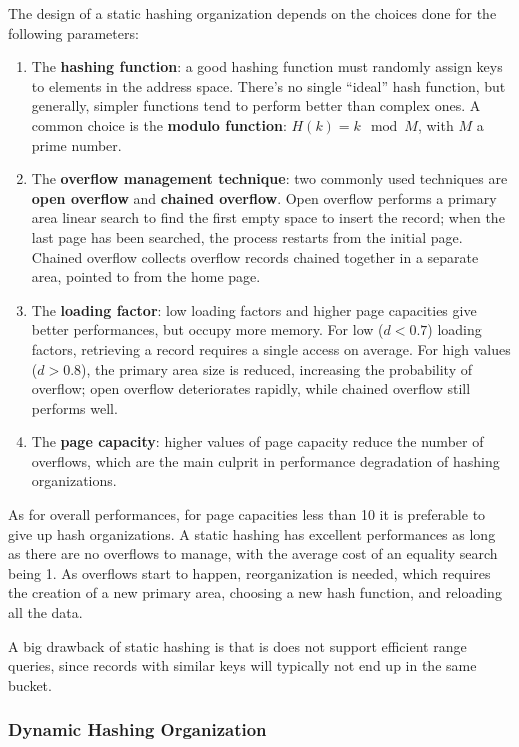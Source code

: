 The design of a static hashing organization depends on the choices done for the following parameters:
\begin{enumerate}
    \item The \textbf{hashing function}: a good hashing function must randomly assign keys to elements in the address space. There's no single ``ideal'' hash function, but generally, simpler functions tend to perform better than complex ones. A common choice is the \textbf{modulo function}: $H(k) = k \mod M$, with $M$ a prime number.

    \item The \textbf{overflow management technique}: two commonly used techniques are \textbf{open overflow} and \textbf{chained overflow}. Open overflow performs a primary area linear search to find the first empty space to insert the record; when the last page has been searched, the process restarts from the initial page. Chained overflow collects overflow records chained together in a separate area, pointed to from the home page.

    \item The \textbf{loading factor}: low loading factors and higher page capacities give better performances, but occupy more memory. For low ($d < 0.7$) loading factors, retrieving a record requires a single access on average. For high values ($d > 0.8$), the primary area size is reduced, increasing the probability of overflow; open overflow deteriorates rapidly, while chained overflow still performs well.  

    \item The \textbf{page capacity}: higher values of page capacity reduce the number of overflows, which are the main culprit in performance degradation of hashing organizations.
\end{enumerate}
As for overall performances, for page capacities less than 10 it is preferable to give up hash organizations. A static hashing has excellent performances as long as there are no overflows to manage, with the average cost of an equality search being 1. As overflows start to happen, reorganization is needed, which requires the creation of a new primary area, choosing a new hash function, and reloading all the data.

A big drawback of static hashing is that is does not support efficient range queries, since records with similar keys will typically not end up in the same bucket.

\subsubsection{Dynamic Hashing Organization}

